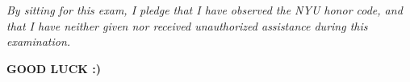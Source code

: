 \documentclass[10pt, addpoints]{exam}
\theoremstyle{definition}
\renewcommand\arraystretch{2}
\renewcommand\arraystretch{2}
\begin{document}
\begin{titlepage}
\begin{itemize}



\end{itemize}

\vspace{0.3in}


\vfill
\begin{center}
\emph{By sitting for this exam, I pledge that I have observed the NYU honor code, and that I have neither given nor
received unauthorized assistance during this examination.}
\end{center}


\begin{center}
 {\large \bf GOOD LUCK :)}
\end{center}

\end{titlepage}

\pointsinrightmargin
\renewcommand\arraystretch{1}
\end{document}
